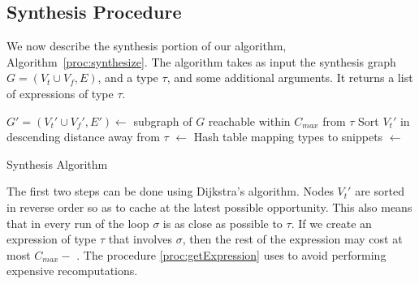 \subsection{Synthesis Procedure}
\label{sec:algorithm:synthesis}
We now describe the synthesis portion of our algorithm, Algorithm~\ref{proc:synthesize}. The algorithm takes as input the synthesis graph $G=(V_t \cup V_f, E)$, and a type $\tau$, and some additional 
arguments. It returns a list of expressions of type $\tau$.

\begin{algorithm}
\BlankLine
$G'=(V_t'\cup V_f', E') \longleftarrow$ subgraph of $G$ reachable within $C_{max}$ from $\tau$ \;
Sort $V_t'$ in descending distance away from $\tau$ \;
\Snips $\longleftarrow$ Hash table mapping types to snippets \;
\Exprs $\longleftarrow$ \Snips[$\tau$] \;
\caption{Synthesis Algorithm}\label{proc:synthesize}
\end{algorithm}

The first two steps can be done using Dijkstra's algorithm. Nodes $V_t'$ are sorted in reverse order so as
to cache at the latest possible opportunity. This also means that in every run of the loop 
$\sigma$ is as close as possible to $\tau$. If we
create an expression of type  $\tau$ that involves $\sigma$, then the rest of the expression may cost at most $C_{max} - $
\Dist{$\sigma$}. The procedure \ref{proc:getExpression} uses \Snips to
avoid performing expensive recomputations.

